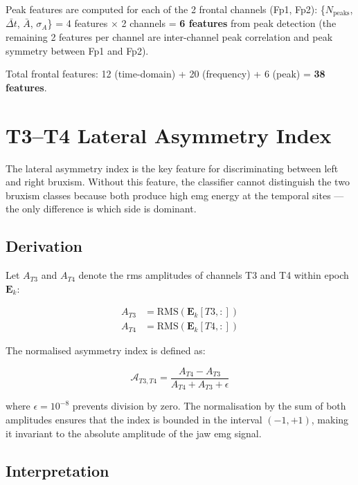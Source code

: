 Peak features are computed for each of the 2 frontal channels
(Fp1, Fp2): \{$N_{\text{peaks}}$, $\bar{\Delta t}$,
$\bar{A}$, $\sigma_A$\} = 4 features $\times$ 2 channels
= \textbf{6 features} from peak detection (the remaining
2 features per channel are inter-channel peak correlation and
peak symmetry between Fp1 and Fp2).

Total frontal features: 12 (time-domain) + 20 (frequency)
+ 6 (peak) = \textbf{38 features}.

\section{T3--T4 Lateral Asymmetry Index}
\label{sec:fe_asym}

The lateral asymmetry index is the key feature for
discriminating between left and right bruxism. Without this
feature, the classifier cannot distinguish the two bruxism
classes because both produce high \acrshort{emg} energy at
the temporal sites — the only difference is which side
is dominant.

\subsection{Derivation}

Let $A_{T3}$ and $A_{T4}$ denote the \acrshort{rms}
amplitudes of channels T3 and T4 within epoch $\mathbf{E}_k$:

\begin{align}
A_{T3} &= \text{RMS}\left(\mathbf{E}_k[T3, :]\right) \\
A_{T4} &= \text{RMS}\left(\mathbf{E}_k[T4, :]\right)
\end{align}

The normalised asymmetry index is defined as:

\begin{equation}
\boxed{
\mathcal{A}_{T3,T4} = \frac{A_{T4} - A_{T3}}
{A_{T4} + A_{T3} + \epsilon}
}
\label{eq:asymmetry}
\end{equation}

\noindent where $\epsilon = 10^{-8}$ prevents division by
zero. The normalisation by the sum of both amplitudes ensures
that the index is bounded in the interval $(-1, +1)$,
making it invariant to the absolute amplitude of the jaw
\acrshort{emg} signal.

\subsection{Interpretation}


